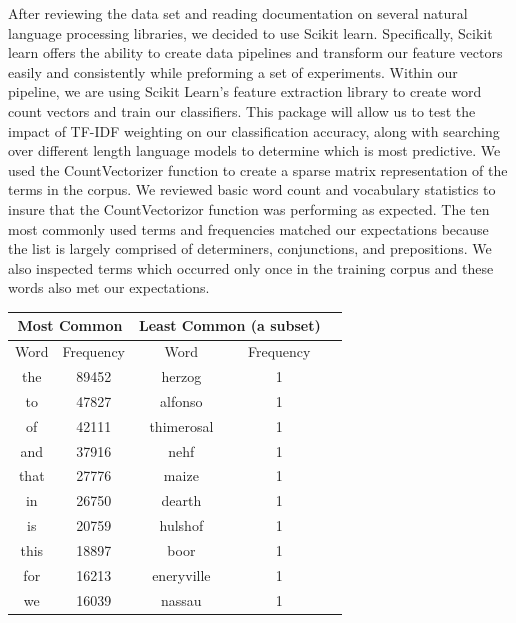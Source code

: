 \documentclass[a4paper, 11pt]{article}
\begin{document}
\noindent
After reviewing the data set and reading documentation on several natural language processing libraries, we decided to use Scikit learn.  Specifically, Scikit learn offers the ability to create data pipelines and transform our feature vectors easily and consistently while preforming a set of experiments. Within our pipeline, we are using Scikit Learn's feature extraction library to create word count vectors and train our classifiers. This package will allow us to test the impact of TF-IDF weighting on our classification accuracy, along with searching over different length language models to determine which is most predictive. We used the CountVectorizer function to create a sparse matrix representation of the terms in the corpus. We reviewed basic word count and vocabulary statistics to insure that the CountVectorizor function was performing as expected. The ten most commonly used terms and frequencies matched our expectations because the list is largely comprised of determiners, conjunctions, and prepositions. We also inspected terms which occurred only once in the training corpus and these words also met our expectations.
\begin{table}[h]
\centering
\label{Most and Least Common Words}
\begin{tabular}{|c|c|c|c|c|}
\multicolumn{2}{c}{Most Common} & \multicolumn{2}{l}{Least Common (a subset)} \\
\hline
Word                 & Frequency        &  Word & Frequency      \\
\hline
the                  & 89452                & herzog &1\\
to                  & 47827                 &   alfonso &1\\
of                    & 42111                  & thimerosal&1\\
and                   & 37916                    & nehf&1\\
that            & 27776                   & maize&1\\
in                   & 26750                   & dearth&1\\
is                   & 20759                   &hulshof&1\\
this                    & 18897                   & boor&1\\
for                   & 16213                    &eneryville& 1\\
we                & 16039                 & nassau & 1 \\
\hline
\end{tabular}
\end{table}
\end{document}
